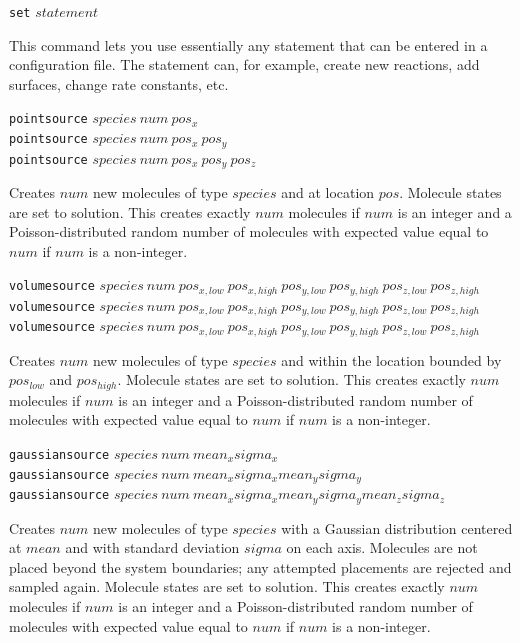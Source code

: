 \documentclass {book}
\newcommand {\ttt} {\texttt}
\begin{document}
\begin{description}

\item{\ttt{set} $statement$}

This command lets you use essentially any statement that can be entered in a configuration file. The statement can, for example, create new reactions, add surfaces, change rate constants, etc.

\item{\ttt{pointsource} $species\ num\ pos_x$\\
\ttt{pointsource} $species\ num\ pos_x\ pos_y$\\
\ttt{pointsource} $species\ num\ pos_x\ pos_y\ pos_z$}

Creates $num$ new molecules of type $species$ and at location $pos$. Molecule states are set to solution. This creates exactly $num$ molecules if $num$ is an integer and a Poisson-distributed random number of molecules with expected value equal to $num$ if $num$ is a non-integer.

\item{\ttt{volumesource} $species\ num\ pos_{x,low}\ pos_{x,high}\ pos_{y,low}\ pos_{y,high}\ pos_{z,low}\ pos_{z,high}$\\
\ttt{volumesource} $species\ num\ pos_{x,low}\ pos_{x,high}\ pos_{y,low}\ pos_{y,high}\ pos_{z,low}\ pos_{z,high}$\\
\ttt{volumesource} $species\ num\ pos_{x,low}\ pos_{x,high}\ pos_{y,low}\ pos_{y,high}\ pos_{z,low}\ pos_{z,high}$}

Creates $num$ new molecules of type $species$ and within the location bounded by $pos_{low}$ and $pos_{high}$. Molecule states are set to solution. This creates exactly $num$ molecules if $num$ is an integer and a Poisson-distributed random number of molecules with expected value equal to $num$ if $num$ is a non-integer.

\item{\ttt{gaussiansource} $species\ num\ mean_x sigma_x$\\
\ttt{gaussiansource} $species\ num\ mean_x sigma_x mean_y sigma_y$\\
\ttt{gaussiansource} $species\ num\ mean_x sigma_x mean_y sigma_y mean_z sigma_z$}

Creates $num$ new molecules of type $species$ with a Gaussian distribution centered at $mean$ and with standard deviation $sigma$ on each axis. Molecules are not placed beyond the system boundaries; any attempted placements are rejected and sampled again. Molecule states are set to solution. This creates exactly $num$ molecules if $num$ is an integer and a Poisson-distributed random number of molecules with expected value equal to $num$ if $num$ is a non-integer.


\end{description}
\end{document}
